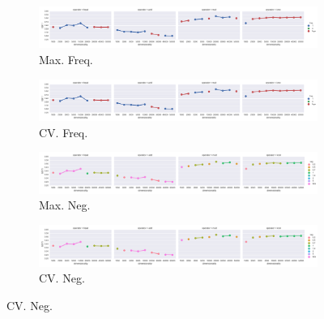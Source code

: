 
\clearpage
{}
\recalctypearea


\begin{landscape}
\thispagestyle{empty} %

\begin{figure}
  \centering

  \begin{subfigure}[t]{0.6\textwidth}
    \includegraphics[width=\textwidth]{supplement/figures/GS11-max_-selection-freq}
    \caption{Max. Freq.}
    \label{fig:}
  \end{subfigure}
  \begin{subfigure}[t]{0.6\textwidth}
    \includegraphics[width=\textwidth]{supplement/figures/GS11-cross_validation-selection-freq}
    \caption{CV. Freq.}
    \label{fig:}
  \end{subfigure}

  \begin{subfigure}[t]{0.6\textwidth}
    \includegraphics[width=\textwidth]{supplement/figures/GS11-max_-selection-neg}
    \caption{Max. Neg.}
    \label{fig:}
  \end{subfigure}
  \begin{subfigure}[t]{0.6\textwidth}
    \includegraphics[width=\textwidth]{supplement/figures/GS11-cross_validation-selection-neg}
    \caption{CV. Neg.}
    \label{fig:}
  \end{subfigure}


\end{figure}
\end{landscape}
